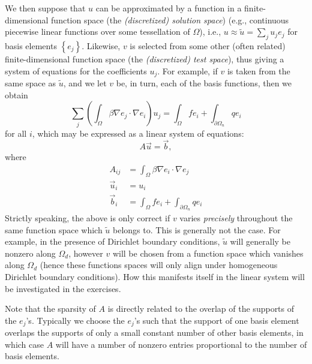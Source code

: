 We then suppose that $u$ can be approximated by a function in a finite-dimensional function space (the \emph{(discretized) solution space}) (e.g., continuous piecewise linear functions over some tessellation of $\Omega$), i.e., $u \approx \tilde{u} = \sum_j u_j e_j$ for basis elements $\left\{ e_j \right\}$. Likewise, $v$ is selected from some other (often related) finite-dimensional function space (the \emph{(discretized) test space}), thus giving a system of equations for the coefficients $u_j$. For example, if $v$ is taken from the same space as $\tilde{u}$, and we let $v$ be, in turn, each of the basis functions, then we obtain
\begin{equation}\label{eq:poisson.system.i}
\sum_j \left( \int_{\Omega} \beta \nabla e_j \cdot \nabla e_i \right) u_j = \int_{\Omega} f e_i + \int_{\partial \Omega_n} q e_i
\end{equation}
for all $i$, which may be expressed as a linear system of equations:
\begin{equation}\label{eq:poisson.system.a}
A \vec{u} = \vec{b},
\end{equation}
where
\begin{subequations}\label{eq:poisson.system.b}
\begin{align}
A_{ij} & = \int_{\Omega} \beta \nabla e_i \cdot \nabla e_j \label{eq:poisson.system.Aij} \\
\vec{u}_i & = u_i \\
\vec{b}_i & = \int_{\Omega} f e_i + \int_{\partial \Omega_n} q e_i \label{eq:poisson.system.bi}
\end{align}
\end{subequations}
Strictly speaking, the above is only correct if $v$ varies \emph{precisely} throughout the same function space which $\tilde{u}$ belongs to. This is generally not the case. For example, in the presence of Dirichlet boundary conditions, $\tilde{u}$ will generally be nonzero along $\Omega_d$, however $v$ will be chosen from a function space which vanishes along $\Omega_d$ (hence these functions spaces will only align under homogeneous Dirichlet boundary conditions). How this manifests itself in the linear system will be investigated in the exercises.

Note that the sparsity of $A$ is directly related to the overlap of the supports of the $e_j$'s. Typically we choose the $e_j$'s such that the support of one basis element overlaps the supports of only a small constant number of other basis elements, in which case $A$ will have a number of nonzero entries proportional to the number of basis elements.

